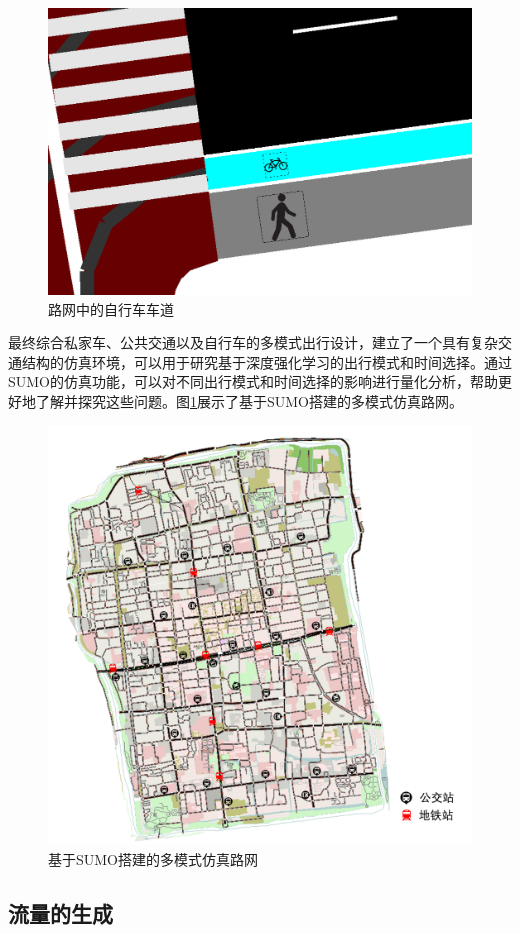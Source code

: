 \begin{figure}[H]
  \centering
  \includegraphics[width=.4\linewidth]{figures/content/bike.png}
  \caption{路网中的自行车车道}
  \label{sumobike}
\end{figure}

最终综合私家车、公共交通以及自行车的多模式出行设计，建立了一个具有复杂交通结构的仿真环境，可以用于研究基于深度强化学习的出行模式和时间选择。通过SUMO的仿真功能，可以对不同出行模式和时间选择的影响进行量化分析，帮助更好地了解并探究这些问题。图\ref{sumobike}展示了基于SUMO搭建的多模式仿真路网。

\begin{figure}[H]
  \centering
  \includegraphics[width=.65\linewidth]{figures/content/multimodal.png}
  \caption{基于SUMO搭建的多模式仿真路网}
  \label{multimodal}
\end{figure}


\subsection{流量的生成}

